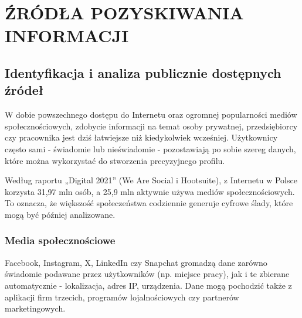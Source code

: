 \chapter{ŹRÓDŁA POZYSKIWANIA INFORMACJI}
\enlargethispage{20pt}

\section{Identyfikacja i analiza publicznie dostępnych źródeł \cite{zrodlo}}

W dobie powszechnego dostępu do Internetu oraz ogromnej popularności mediów społecznościowych, zdobycie informacji na temat osoby prywatnej, przedsiębiorcy czy pracownika jest dziś łatwiejsze niż kiedykolwiek wcześniej. Użytkownicy często sami - świadomie lub nieświadomie - pozostawiają po sobie szereg danych, które można wykorzystać do stworzenia precyzyjnego profilu.

Według raportu „Digital 2021” (We Are Social i Hootsuite), z Internetu w Polsce korzysta 31,97 mln osób, a 25,9 mln aktywnie używa mediów społecznościowych. To oznacza, że większość społeczeństwa codziennie generuje cyfrowe ślady, które mogą być później analizowane.

\subsection{Media społecznościowe \cite{zrodlo2}}

Facebook, Instagram, X, LinkedIn czy Snapchat gromadzą dane zarówno świadomie podawane przez użytkowników (np. miejsce pracy), jak i te zbierane automatycznie - lokalizacja, adres IP, urządzenia.
Dane mogą pochodzić także z aplikacji firm trzecich, programów lojalnościowych czy partnerów marketingowych.

